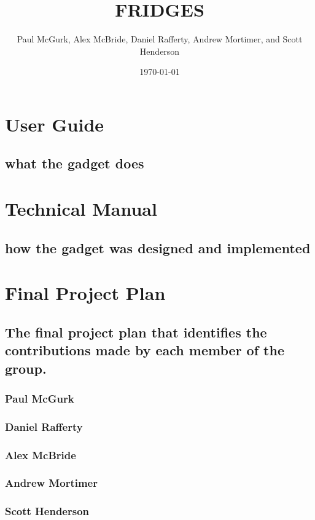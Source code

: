 \documentclass[10pt]{article}
\title{FRIDGES}
\author{Paul McGurk, Alex McBride, Daniel Rafferty, Andrew Mortimer, and Scott Henderson}
\date{\today}
\begin{document}
\begin{titlepage}
\maketitle
\end{titlepage}

\linespread{1.15} %
\renewcommand{\arraystretch}{1.2} %

\tableofcontents

\newpage
\section{User Guide}
\subsection{what the gadget does}

\section{Technical Manual}
\subsection{how the gadget was designed and implemented}

\section{Final Project Plan}
\subsection{The final project plan that identifies the contributions made by each member of the group.}
\subsubsection{Paul McGurk}
\subsubsection{Daniel Rafferty}
\subsubsection{Alex McBride}
\subsubsection{Andrew Mortimer}
\subsubsection{Scott Henderson}
\end{document}
